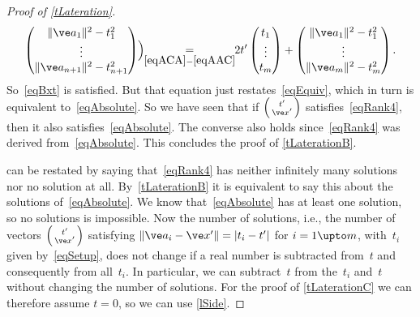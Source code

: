 \documentclass[reqno]{amsart}
\begin{document}
\begin{proof}[Proof of \cref{tLateration}]
\begin{multline*}
    \begin{pmatrix}
      \lVert\ve a_1\rVert^2 - t_1^2 \\
      \vdots \\
      \lVert\ve a_{n+1}\rVert^2 - t_{n+1}^2
    \end{pmatrix}\Bigr)
    \!\!\underset{\eqref{eqACA}-\eqref{eqAAC}}{=}\!\! 2 t'
    \begin{pmatrix}
      t_1 \\ \vdots \\ t_m
    \end{pmatrix} +
    \begin{pmatrix}
      \lVert\ve a_1\rVert^2 - t_1^2 \\
      \vdots \\
      \lVert\ve a_m\rVert^2 - t_m^2
    \end{pmatrix}.
  \end{multline*}
  So~\eqref{eqBxt} is satisfied. But that equation just
  restates~\eqref{eqEquiv}, which in turn is equivalent
  to~\eqref{eqAbsolute}. So we have seen that if
  $\left(\begin{smallmatrix} t' \\ \ve x'\end{smallmatrix}\right)$
  satisfies~\eqref{eqRank4}, then it also
  satisfies~\eqref{eqAbsolute}. The converse also holds
  since~\eqref{eqRank4} was derived from~\eqref{eqAbsolute}. This
  concludes the proof of \cref{tLaterationB}.

   can be restated by saying that~\eqref{eqRank4}
  has neither infinitely many solutions nor no solution at
  all. By~\ref{tLaterationB} it is equivalent to say this about the
  solutions of~\eqref{eqAbsolute}. We know that~\eqref{eqAbsolute} has
  at least one solution, so no solutions is impossible. Now the number
  of solutions, i.e., the number of vectors
  $\left(\begin{smallmatrix} t' \\ \ve x'\end{smallmatrix}\right)$
  satisfying $\lVert\ve a_i - \ve x'\rVert = |t_i - t'|$ for
  $i = 1 \upto m$, with~$t_i$ given by~\eqref{eqSetup}, does not
  change if a real number is subtracted from~$t$ and consequently from
  all~$t_i$. In particular, we can subtract~$t$ from the~$t_i$ and~$t$
  without changing the number of solutions. For the proof of
  \cref{tLaterationC} we can therefore assume $t = 0$, so we can use
  \cref{lSide}.


\end{proof}
\end{document}

